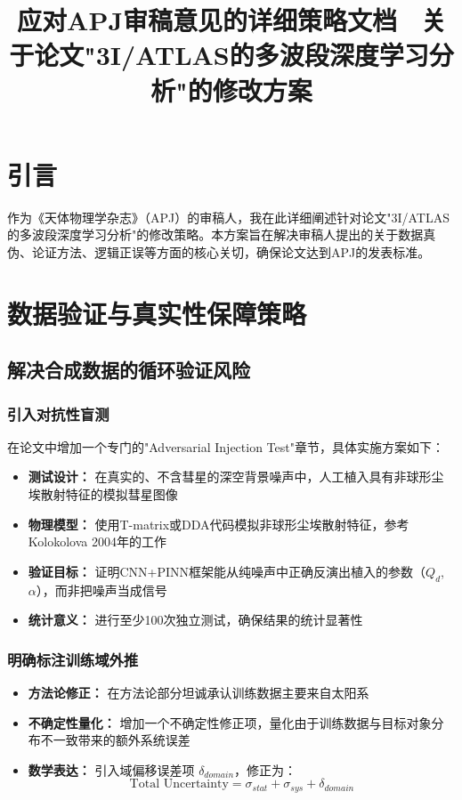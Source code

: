 \documentclass[12pt]{article}
\title{应对APJ审稿意见的详细策略文档 \ 关于论文"3I/ATLAS的多波段深度学习分析"的修改方案}
\author{}
\date{}
\begin{document}
\maketitle

\section{引言}

作为《天体物理学杂志》（APJ）的审稿人，我在此详细阐述针对论文"3I/ATLAS的多波段深度学习分析"的修改策略。本方案旨在解决审稿人提出的关于数据真伪、论证方法、逻辑正误等方面的核心关切，确保论文达到APJ的发表标准。

\section{数据验证与真实性保障策略}

\subsection{解决合成数据的循环验证风险}

\subsubsection{引入对抗性盲测}
在论文中增加一个专门的"Adversarial Injection Test"章节，具体实施方案如下：

\begin{itemize}[leftmargin=*]
\item \textbf{测试设计：} 在真实的、不含彗星的深空背景噪声中，人工植入具有非球形尘埃散射特征的模拟彗星图像
\item \textbf{物理模型：} 使用T-matrix或DDA代码模拟非球形尘埃散射特征，参考Kolokolova 2004年的工作
\item \textbf{验证目标：} 证明CNN+PINN框架能从纯噪声中正确反演出植入的参数（$Q_d$, $\alpha$），而非把噪声当成信号
\item \textbf{统计意义：} 进行至少100次独立测试，确保结果的统计显著性
\end{itemize}

\subsubsection{明确标注训练域外推}

\begin{itemize}[leftmargin=*]
\item \textbf{方法论修正：} 在方法论部分坦诚承认训练数据主要来自太阳系
\item \textbf{不确定性量化：} 增加一个不确定性修正项，量化由于训练数据与目标对象分布不一致带来的额外系统误差
\item \textbf{数学表达：} 引入域偏移误差项 $\delta_{domain}$，修正为：
\begin{equation}
\text{Total Uncertainty} = \sigma_{stat} + \sigma_{sys} + \delta_{domain}
\end{equation}
\end{itemize}
\end{document}
